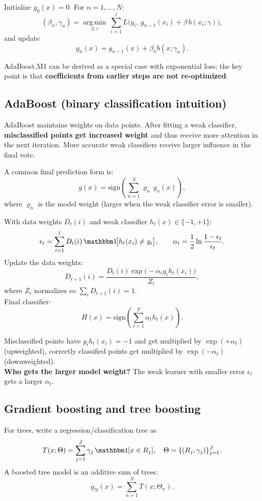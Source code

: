 \documentclass[11pt, oneside]{book}
\newcommand{\argmin}{\operatorname*{arg\,min}}
\newcommand{\1}{\ind}                       %
\begin{document}
\begin{thmbox}[title={Forward Stagewise Additive Modeling}]
Initialize $g_0(x)=0$. For $n=1,\dots,N$:
\[
(\beta_n,\gamma_n)=\argmin_{\beta,\gamma}\ \sum_{i=1}^{l} L\big(y_i,\, g_{n-1}(x_i)+\beta\,b(x_i;\gamma)\big),
\]
and update
\[
g_n(x)=g_{n-1}(x)+\beta_n b(x;\gamma_n).
\]
\end{thmbox}

AdaBoost.M1 can be derived as a special case with exponential loss; the key point is that \textbf{coefficients from earlier steps are not re-optimized}.

\subsection{AdaBoost (binary classification intuition)}
AdaBoost maintains weights on data points.
After fitting a weak classifier, \textbf{misclassified points get increased weight} and thus receive more attention in the next iteration.
More accurate weak classifiers receive larger influence in the final vote.

A common final prediction form is:
\[
  g(x)=\mathrm{sign}\left(\sum_{n=1}^{N}\varrho_n\, g_n(x)\right),
\]
where $\varrho_n$ is the model weight (larger when the weak classifier error is smaller).

\begin{thmbox}[title={AdaBoost: Binary Standard Formulas}]
With data weights $D_t(i)$ and weak classifier $h_t(x)\in\{-1,+1\}$:
\[
\epsilon_t=\sum_{i=1}^l D_t(i)\,\1\!\big[h_t(x_i)\neq y_i\big],\qquad
\alpha_t=\frac12\ln\frac{1-\epsilon_t}{\epsilon_t}.
\]
Update the data weights:
\[
D_{t+1}(i)=\frac{D_t(i)\exp\!\big(-\alpha_t y_i h_t(x_i)\big)}{Z_t},
\]
where $Z_t$ normalizes so $\sum_i D_{t+1}(i)=1$.\\
Final classifier:
\[
H(x)=\mathrm{sign}\!\left(\sum_{t=1}^T \alpha_t h_t(x)\right).
\]
\end{thmbox}

\begin{intbox}[title={AdaBoost Weight Update Intuition}]
Misclassified points have $y_i h_t(x_i)=-1$ and get multiplied by $\exp(+\alpha_t)$ (upweighted),
correctly classified points get multiplied by $\exp(-\alpha_t)$ (downweighted).\\
\textbf{Who gets the larger model weight?} The weak learner with smaller error $\epsilon_t$ gets a larger $\alpha_t$.
\end{intbox}

\subsection{Gradient boosting and tree boosting}
For trees, write a regression/classification tree as
\[
T(x;\Theta)=\sum_{j=1}^{J}\gamma_j\,\1[x\in R_j],
\quad
\Theta=\{(R_j,\gamma_j)\}_{j=1}^{J}.
\]
A boosted tree model is an additive sum of trees:
\[
g_N(x)=\sum_{n=1}^{N}T(x;\Theta_n).
\]
\end{document}
